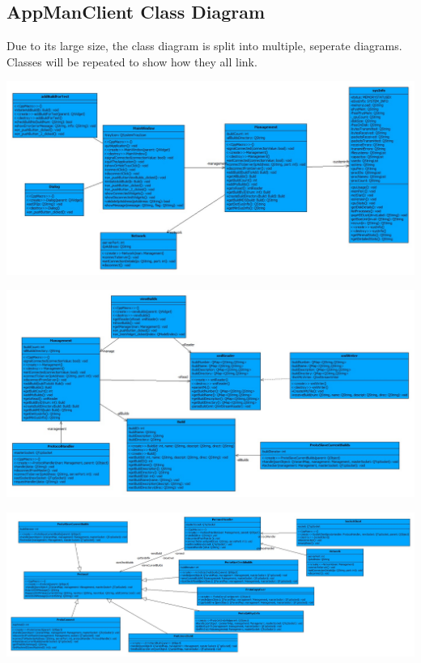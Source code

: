 \documentclass[a4paper,12pt,final]{article}
\begin{document}
\subsection{AppManClient Class Diagram}
Due to its large size, the class diagram is split into multiple, seperate diagrams. Classes will be repeated to show how they all link.\\
\begin{center}
	\includegraphics[angle = 90,scale = 0.47]{Part1.jpg}
\end{center}
\begin{center}
	\includegraphics[angle = 90,scale = 0.47]{Part1_1.jpg}
\end{center}
\begin{center}
	\includegraphics[angle = 90,scale = 0.4]{Part2.jpg}
\end{center}
\end{document}

